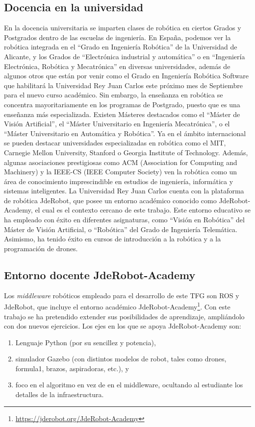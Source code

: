 \subsection{Docencia en la universidad}
En la docencia universitaria se imparten clases de robótica en ciertos Grados y Postgrados dentro de las escuelas de ingeniería. En España, podemos ver la robótica integrada en el “Grado en Ingeniería Robótica” de la Universidad de Alicante, y los Grados de “Electrónica industrial y automática” o en “Ingeniería Electrónica, Robótica y Mecatrónica” en diversas universidades, además de algunos otros que están por venir como el Grado en Ingeniería Robótica Software que habilitará la Universidad Rey Juan Carlos este próximo mes de Septiembre para el nuevo curso académico. Sin embargo, la enseñanza en robótica se concentra mayoritariamente en los programas de Postgrado, puesto que es una enseñanza más especializada. Existen Másteres destacados como el “Máster de Visión Artificial”, el “Máster Universitario en Ingeniería Mecatrónica”, o el “Máster Universitario en Automática y Robótica”.
Ya en el ámbito internacional se pueden destacar universidades especializadas en robótica como el MIT, Carnegie Mellon University, Stanford o Georgia Institute of Technology. Además, algunas asociaciones prestigiosas como ACM (Association for Computing and Machinery) y la IEEE-CS (IEEE Computer Society) ven la robótica como un área de conocimiento imprescindible en estudios de ingeniería, informática y sistemas inteligentes.
La Universidad Rey Juan Carlos cuenta con la plataforma de robótica JdeRobot, que posee un entorno académico conocido como JdeRobot-Academy, el cual es el contexto cercano de este trabajo. Este entorno educativo se ha empleado con éxito en diferentes asignaturas, como “Visión en Robótica” del Máster de Visión Artificial, o “Robótica” del Grado de Ingeniería Telemática. Asimismo, ha tenido éxito en cursos de introducción a la robótica y a la programación de drones.


\subsection{Entorno docente JdeRobot-Academy}
Los \textit{middleware} robóticos empleado para el desarrollo de este TFG son ROS y JdeRobot, que incluye el entorno académico JdeRobot-Academy\footnote{\url{https://jderobot.org/JdeRobot-Academy}}. Con este trabajo se ha pretendido extender sus posibilidades de aprendizaje, ampliándolo con dos nuevos ejercicios. 
\vspace{0.6cm}
Los ejes en los que se apoya JdeRobot-Academy son:
\begin{enumerate}[label=\alph*)]
	\item Lenguaje Python (por su sencillez y potencia),
	\item simulador Gazebo (con distintos modelos de robot, tales como drones, formula1, brazos, aspiradoras, etc.), y
	\item foco en el algoritmo en vez de en el middleware, ocultando al estudiante los detalles de la infraestructura.
\end{enumerate}

